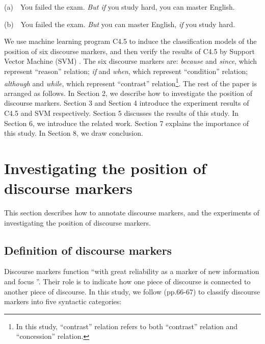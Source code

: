 \documentclass[english]{jnlp_1.3e}
\begin{document}
(a)~~You failed the exam. \textit{But if} you study hard, you can master English.

(b)~~You failed the exam. \textit{But} you can master English, \textit{if} you study hard. 

We use machine learning program C4.5 \cite{Quinlan93} to induce the classification models 
of the position of six discourse markers, and then verify the results of 
C4.5 by Support Vector Machine (SVM) \cite{Vapnik99}. The six discourse markers are: 
\textit{because} and \textit{since}, which represent ``reason'' relation; 
\textit{if} and \textit{when}, which represent ``condition'' relation; 
\textit{although} and \textit{while}, which represent ``contrast'' 
relation\footnote{In this study, ``contrast'' relation refers to both ``contrast'' relation and ``concession'' relation.}. 
The rest of the paper is arranged as follows. In Section 2, we describe how to investigate the
position of discourse markers. Section 3 and Section 4 introduce the 
experiment results of C4.5 and SVM respectively. Section 5 discusses the 
results of this study. In Section 6, we introduce the related work. 
Section 7 explains the importance of this study. In Section 8, we draw conclusion.

\section{Investigating the position of discourse markers}  

This section describes how to annotate discourse markers, and the 
experiments of investigating the position of discourse markers.

\subsection{Definition of discourse markers}

Discourse markers function ``with great reliability as a marker of new
information and focus \cite{Underhill88}''. Their role is to indicate how one
piece of discourse is connected to another piece of discourse. In this study, 
we follow \cite{Knott96} (pp.66-67) to classify discourse markers into five syntactic 
categories:
\end{document}
